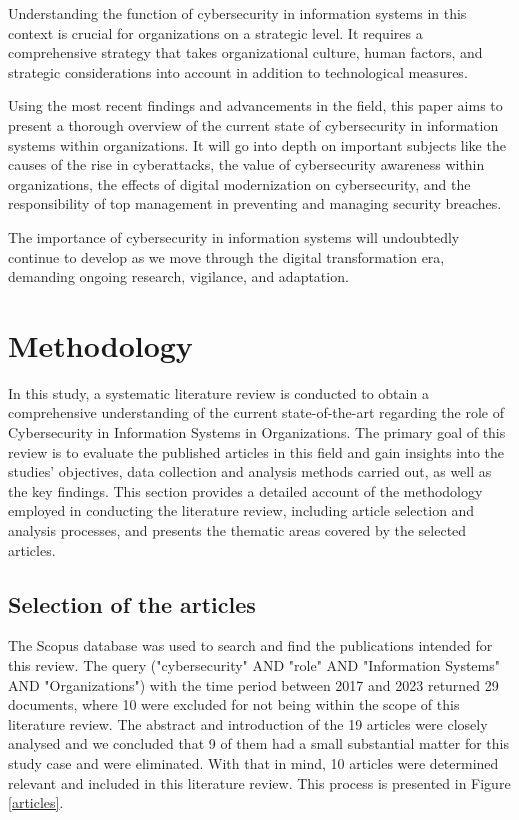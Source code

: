 \documentclass[journal]{IEEEtran}
\begin{document}
Understanding the function of cybersecurity in information systems in this context is crucial for organizations on a strategic level. It requires a comprehensive strategy that takes organizational culture, human factors, and strategic considerations into account in addition to technological measures.

Using the most recent findings and advancements in the field, this paper aims to present a thorough overview of the current state of cybersecurity in information systems within organizations. It will go into depth on important subjects like the causes of the rise in cyberattacks, the value of cybersecurity awareness within organizations, the effects of digital modernization on cybersecurity, and the responsibility of top management in preventing and managing security breaches.

The importance of cybersecurity in information systems will undoubtedly continue to develop as we move through the digital transformation era, demanding ongoing research, vigilance, and adaptation.


\section{Methodology}

In this study, a systematic literature review is conducted to obtain a comprehensive understanding of the current state-of-the-art regarding the role of Cybersecurity in Information Systems in Organizations. The primary goal of this review is to evaluate the published articles in this field and gain insights into the studies' objectives, data collection and analysis methods carried out, as well as the key findings.
This section provides a detailed account of the methodology employed in conducting the literature review, including article selection and analysis processes, and presents the thematic areas covered by the selected articles.

\subsection{Selection of the articles}

The Scopus database was used to search and find the publications intended for this review. The query ("cybersecurity" AND "role" AND "Information Systems" AND "Organizations") with the time period between 2017 and 2023 returned 29 documents, where 10 were excluded for not being within the scope of this literature review. The abstract and introduction of the 19 articles were closely analysed and we concluded that 9 of them had a small substantial matter for this study case and were eliminated. 
With that in mind, 10 articles were determined relevant and included in this literature review. This process is presented in Figure \ref{articles}.
\end{document}
